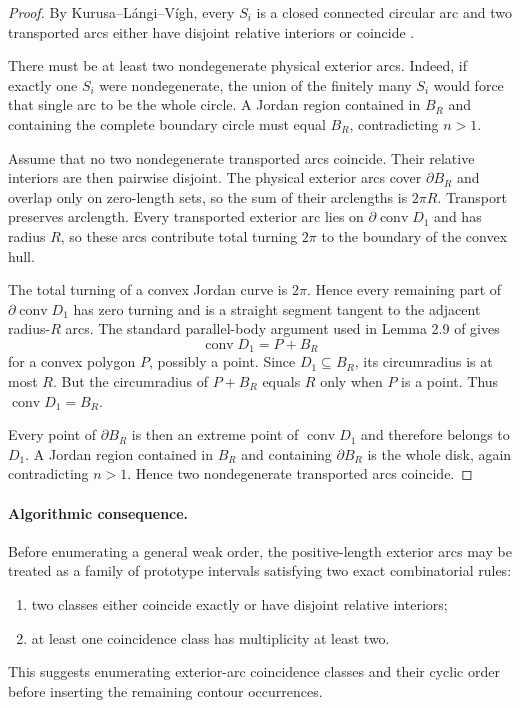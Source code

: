 \documentclass[11pt]{article}
\theoremstyle{definition}
\theoremstyle{remark}
\newcommand{\BR}{B_R}
\newcommand{\conv}{\operatorname{conv}}
\begin{document}
\begin{proof}
By Kurusa--L\'angi--V\'igh, every $S_i$ is a closed connected circular arc and two transported arcs either have disjoint relative interiors or coincide \cite{KLV2020}.

There must be at least two nondegenerate physical exterior arcs.  Indeed, if exactly one $S_i$ were nondegenerate, the union of the finitely many $S_i$ would force that single arc to be the whole circle.  A Jordan region contained in $\BR$ and containing the complete boundary circle must equal $\BR$, contradicting $n>1$.

Assume that no two nondegenerate transported arcs coincide.  Their relative interiors are then pairwise disjoint.  The physical exterior arcs cover $\partial\BR$ and overlap only on zero-length sets, so the sum of their arclengths is $2\pi R$.  Transport preserves arclength.  Every transported exterior arc lies on $\partial\conv D_1$ and has radius $R$, so these arcs contribute total turning $2\pi$ to the boundary of the convex hull.

The total turning of a convex Jordan curve is $2\pi$.  Hence every remaining part of $\partial\conv D_1$ has zero turning and is a straight segment tangent to the adjacent radius-$R$ arcs.  The standard parallel-body argument used in Lemma 2.9 of \cite{KLV2020} gives
\[
  \conv D_1=P+\BR
\]
for a convex polygon $P$, possibly a point.  Since $D_1\subseteq\BR$, its circumradius is at most $R$.  But the circumradius of $P+\BR$ equals $R$ only when $P$ is a point.  Thus $\conv D_1=\BR$.

Every point of $\partial\BR$ is then an extreme point of $\conv D_1$ and therefore belongs to $D_1$.  A Jordan region contained in $\BR$ and containing $\partial\BR$ is the whole disk, again contradicting $n>1$.  Hence two nondegenerate transported arcs coincide.
\end{proof}

\paragraph{Algorithmic consequence.}
Before enumerating a general weak order, the positive-length exterior arcs may be treated as a family of prototype intervals satisfying two exact combinatorial rules:
\begin{enumerate}
\item two classes either coincide exactly or have disjoint relative interiors;
\item at least one coincidence class has multiplicity at least two.
\end{enumerate}
This suggests enumerating exterior-arc coincidence classes and their cyclic order before inserting the remaining contour occurrences.
\end{document}
